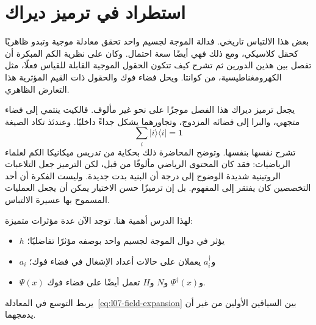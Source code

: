 \begin{classroomqa}
\end{classroomqa}

\section{استطراد في ترميز ديراك}

بعض هذا الالتباس تاريخي. فدالة الموجة لجسيم واحد تحقق معادلة موجية وتبدو ظاهريًا كحقل كلاسيكي، ومع ذلك فهي أيضًا سعة احتمال. وكان على نظرية الكم المبكرة أن تفصل بين هذين الدورين ثم تشرح كيف تتكون الحقول الموجية القابلة للقياس فعلًا، مثل الكهرومغناطيسية، من كوانتا. ويحل فضاء فوك والحقول ذات القيم المؤثرية هذا التعارض الظاهري.

يجعل ترميز ديراك هذا الفصل موجزًا على نحو غير مألوف. فالكيت ينتمي إلى فضاء متجهي، والبرا إلى فضائه المزدوج، وتجاورهما يشكل جداءً داخليًا. وعندئذ تكاد الصيغة
\begin{equation}
\sum_i|i\rangle\langle i|=\mathbf 1
\end{equation}
تشرح نفسها بنفسها. وتوضح المحاضرة ذلك بحكاية من تدريس ميكانيكا الكم لعلماء الرياضيات: فقد كان المحتوى الرياضي مألوفًا من قبل، لكن الترميز جعل التلاعبات الروتينية شديدة الوضوح إلى درجة أن البنية بدت جديدة. وليست الفكرة أن أحد التخصصين كان يفتقر إلى المفهوم. بل إن ترميزًا حسن الاختيار يمكن أن يجعل العمليات المسموح بها عسيرة الالتباس.

لهذا الدرس أهمية هنا. توجد الآن عدة مؤثرات متميزة:
\begin{itemize}
\item \(h\) يؤثر في دوال الموجة لجسيم واحد بوصفه مؤثرًا تفاضليًا؛
\item \(a_i\) و\(a_i^\dagger\) يعملان على حالات أعداد الإشغال في فضاء فوك؛
\item \(\Psi(x)\) و\(\Psi^\dagger(x)\) و\(N\) و\(H\) تعمل أيضًا على فضاء فوك.
\end{itemize}
يربط التوسع في المعادلة~\eqref{eq:l07-field-expansion} بين السياقين الأولين من غير أن يدمجهما.

\begin{classroomqa}
\end{classroomqa}

